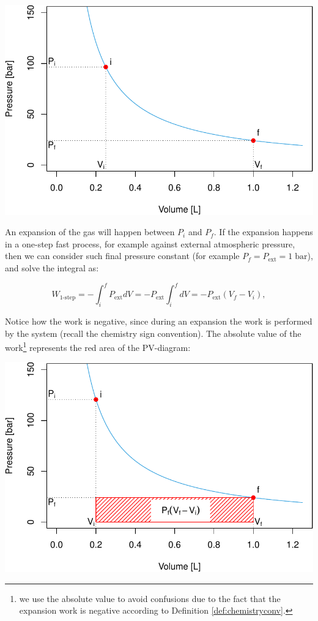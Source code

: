 \documentclass[
  9pt,
]{extbook}
\theoremstyle{definition}
\theoremstyle{definition}
\theoremstyle{definition}
\theoremstyle{definition}
\theoremstyle{remark}
\begin{document}
\begin{center}\includegraphics[width=0.7\linewidth]{pchem1_files/figure-latex/unnamed-chunk-2-1} \end{center}

An expansion of the gas will happen between \(P_i\) and \(P_f\). If the expansion happens in a one-step fast process, for example against external atmospheric pressure, then we can consider such final pressure constant (for example \(P_f=P_{\text{ext}} =1\;\mathrm{bar}\)), and solve the integral as:

\begin{equation}
  W_{\text{1-step}} = - \int_{i}^{f} P_{\text{ext}}dV = -P_{\text{ext}} \int_{i}^{f} dV = -P_{\text{ext}} (V_f-V_i),
  \label{eq:Wint3}
\end{equation}

Notice how the work is negative, since during an expansion the work is performed by the system (recall the chemistry sign convention). The absolute value of the work\footnote{we use the absolute value to avoid confusions due to the fact that the expansion work is negative according to Definition \ref{def:chemistryconv}.} represents the red area of the PV-diagram:

\begin{center}\includegraphics[width=0.7\linewidth]{pchem1_files/figure-latex/unnamed-chunk-3-1} \end{center}
\end{document}
